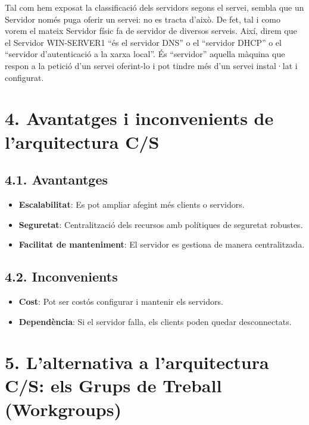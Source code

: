 \documentclass[
  a4paper,
]{article}
\providecommand{\tightlist}{%
  \setlength{\itemsep}{0pt}\setlength{\parskip}{0pt}}
\begin{document}
Tal com hem exposat la classificació dels servidors segons el servei,
sembla que un Servidor només puga oferir un servei: no es tracta d'això.
De fet, tal i como vorem el mateix Servidor físic fa de servidor de
diversos serveis. Així, direm que el Servidor WIN-SERVER1 ``és el
servidor DNS'' o el ``servidor DHCP'' o el ``servidor d'autenticació a
la xarxa local''. És ``servidor'' aquella màquina que respon a la
petició d'un servei oferint-lo i pot tindre més d'un servei instal·lat i
configurat.

\section{4. Avantatges i inconvenients de l'arquitectura
C/S}\label{avantatges-i-inconvenients-de-larquitectura-cs}

\subsection{4.1. Avantantges}\label{avantantges}

\begin{itemize}
\tightlist
\item
  \textbf{Escalabilitat}: Es pot ampliar afegint més clients o
  servidors.
\item
  \textbf{Seguretat}: Centralització dels recursos amb polítiques de
  seguretat robustes.
\item
  \textbf{Facilitat de manteniment}: El servidor es gestiona de manera
  centralitzada.
\end{itemize}

\subsection{4.2. Inconvenients}\label{inconvenients}

\begin{itemize}
\tightlist
\item
  \textbf{Cost}: Pot ser costós configurar i mantenir els servidors.
\item
  \textbf{Dependència}: Si el servidor falla, els clients poden quedar
  desconnectats.
\end{itemize}

\section{5. L'alternativa a l'arquitectura C/S: els Grups de Treball
(Workgroups)}\label{lalternativa-a-larquitectura-cs-els-grups-de-treball-workgroups}
\end{document}

